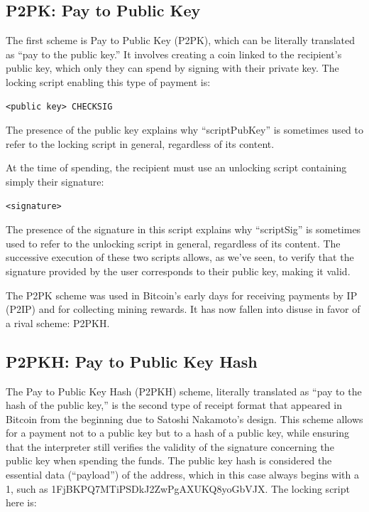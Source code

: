 \documentclass[
  a5paper,
  smalldemyvopaper,10pt,twoside,onecolumn,openright,extrafontsizes,hidelinks]{memoir}
\begin{document}
\subsection{P2PK: Pay to Public Key}\label{p2pk-pay-to-public-key}

The first scheme is Pay to Public Key (P2PK), which can be literally
translated as ``pay to the public key.'' It involves creating a coin
linked to the recipient's public key, which only they can spend by
signing with their private key. The locking script enabling this type of
payment is:

\begin{verbatim}
<public key> CHECKSIG
\end{verbatim}

The presence of the public key explains why ``scriptPubKey'' is
sometimes used to refer to the locking script in general, regardless of
its content.

At the time of spending, the recipient must use an unlocking script
containing simply their signature:

\begin{verbatim}
<signature>
\end{verbatim}

The presence of the signature in this script explains why ``scriptSig''
is sometimes used to refer to the unlocking script in general,
regardless of its content. The successive execution of these two scripts
allows, as we've seen, to verify that the signature provided by the user
corresponds to their public key, making it valid.

The P2PK scheme was used in Bitcoin's early days for receiving payments
by IP (P2IP) and for collecting mining rewards. It has now fallen into
disuse in favor of a rival scheme: P2PKH.

\subsection{P2PKH: Pay to Public Key
Hash}\label{p2pkh-pay-to-public-key-hash}

The Pay to Public Key Hash (P2PKH) scheme, literally translated as ``pay
to the hash of the public key,'' is the second type of receipt format
that appeared in Bitcoin from the beginning due to Satoshi Nakamoto's
design. This scheme allows for a payment not to a public key but to a
hash of a public key, while ensuring that the interpreter still verifies
the validity of the signature concerning the public key when spending
the funds. The public key hash is considered the essential data
(``payload'') of the address, which in this case always begins with a 1,
such as 1FjBKPQ7MTiPSDkJ2ZwPgAXUKQ8yoGbVJX. The locking script here is:
\end{document}
